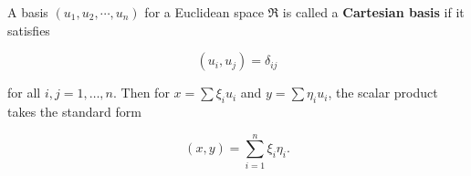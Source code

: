 A basis $(u_1, u_2, \cdots, u_n)$ for a Euclidean space $\Re$ is called a \textbf{Cartesian basis} if it satisfies

$$(u_i, u_j) = \delta_{ij}$$

for all $i, j = 1, \ldots, n$. Then for $x = \sum \xi_i u_i$ and $y = \sum \eta_i u_i$, the scalar product takes the standard form

$$(x, y) = \sum_{i=1}^n \xi_i \eta_i.$$
